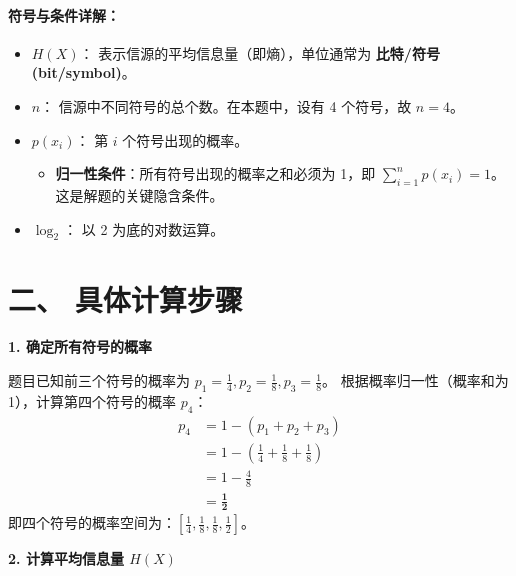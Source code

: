 \documentclass[a4paper,11pt]{ctexart}
\begin{document}
\begin{enumerate}[label=\textbf{1-\arabic*}]
\begin{tcolorbox}[colback=white, colframe=blue!50!black, title=\textbf{题目解答：1-2 符号集平均信息量（信源熵）的计算}]
    \paragraph{符号与条件详解：}
    \begin{itemize}
        \item \textbf{$H(X)$}：
            表示信源的平均信息量（即熵），单位通常为 \textbf{比特/符号 (bit/symbol)}。
        \item \textbf{$n$}：
            信源中不同符号的总个数。在本题中，设有 4 个符号，故 $n=4$。
        \item \textbf{$p(x_i)$}：
            第 $i$ 个符号出现的概率。
            \begin{itemize}
                \item \textbf{归一性条件}：所有符号出现的概率之和必须为 1，即 $\sum_{i=1}^{n} p(x_i) = 1$。这是解题的关键隐含条件。
            \end{itemize}
        \item \textbf{$\log_2$}：
            以 2 为底的对数运算。
    \end{itemize}

\end{tcolorbox}

    \section*{二、 具体计算步骤}
    
    \textbf{1. 确定所有符号的概率}
    
    题目已知前三个符号的概率为 $p_1=\frac{1}{4}, p_2=\frac{1}{8}, p_3=\frac{1}{8}$。
    根据概率归一性（概率和为 1），计算第四个符号的概率 $p_4$：
    \begin{align*}
        p_4 &= 1 - (p_1 + p_2 + p_3) \\
            &= 1 - \left(\frac{1}{4} + \frac{1}{8} + \frac{1}{8}\right) \\
            &= 1 - \frac{4}{8} \\
            &= \mathbf{\frac{1}{2}}
    \end{align*}
    即四个符号的概率空间为：$[\frac{1}{4}, \frac{1}{8}, \frac{1}{8}, \frac{1}{2}]$。

    \vspace{0.5cm} %
    
    \textbf{2. 计算平均信息量 $H(X)$}
    

\end{enumerate}
\end{document}
